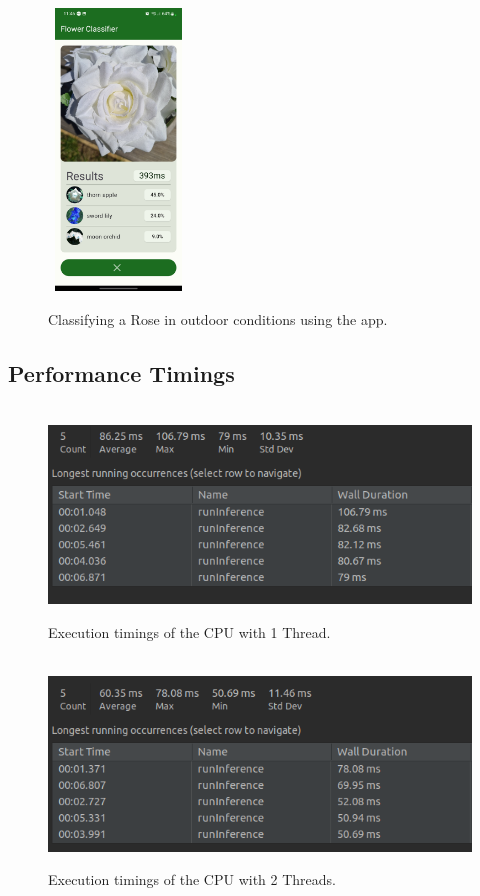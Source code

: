 \documentclass[12pt,a4paper]{report}
\begin{document}
\begin{figure}[h]\
    \includegraphics[width=0.3\textwidth]{rose_light_3.jpg}
    \caption{Classifying a Rose in outdoor conditions using the app.}
    \label{fig:rose_light}
\end{figure}

\clearpage

\subsection{Performance Timings}

\label{subsec:perf_timings}

\begin{figure}[h]\
    \includegraphics[width=\textwidth]{CPU1_Time.png}
    \caption{Execution timings of the CPU with 1 Thread.}
    \label{fig:cpu1}
\end{figure}


\begin{figure}[h]\
    \includegraphics[width=\textwidth]{CPU2_Time.png}
    \caption{Execution timings of the CPU with 2 Threads.}
    \label{fig:cpu2}
\end{figure}
\end{document}
